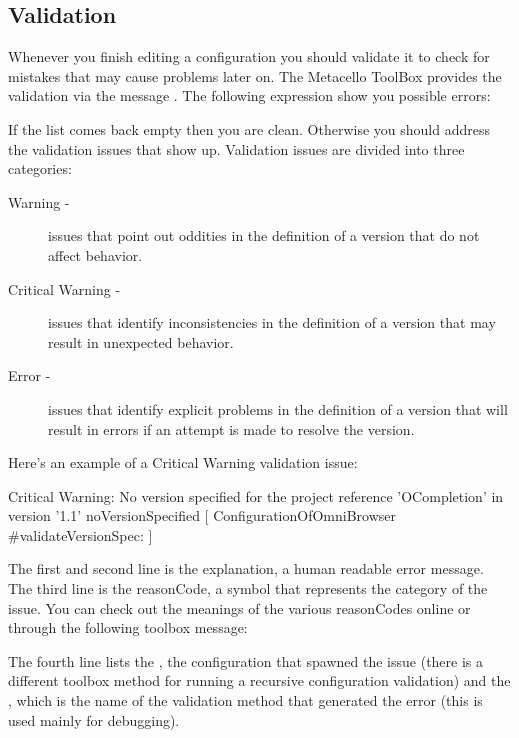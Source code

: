 \documentclass[a4paper,10pt,twoside]{book}
\begin{document}
\begin{code}{}
\begin{code}{}
\subsection{Validation}

Whenever you finish editing a configuration you should validate it to check for mistakes that may cause problems later on. The Metacello ToolBox provides the validation via the message . The following expression show you possible errors: 

If the list comes back empty then you are clean. Otherwise you should address the validation issues that show up. Validation issues are divided into three categories:

\begin{description}
\item[Warning -] issues that point out oddities in the definition of a version that do not affect behavior.
\item[Critical Warning -] issues that identify inconsistencies in the definition of a version that may result in unexpected behavior.
\item[ Error -] issues that identify explicit problems in the definition of a version that will result in errors if an attempt is made to resolve the version.
\end{description}

Here's an example of a Critical Warning validation issue:
\begin{code}{}
Critical Warning: No version specified for the project reference 'OCompletion'
                in version '1.1'
     { noVersionSpecified }
     [ ConfigurationOfOmniBrowser #validateVersionSpec: ]
\end{code}     

The first and second line is the explanation, a human readable error message. The third line is the reasonCode, a symbol that represents the category of the issue. You can check out the meanings of the various reasonCodes online or through the following toolbox message:

The fourth line lists the , \ie the configuration that spawned the issue (there is a different toolbox method for running a recursive configuration validation) and the , which is the name of the validation method that generated the error (this is used mainly for debugging).




\end{code}
\end{code}
\end{document}
